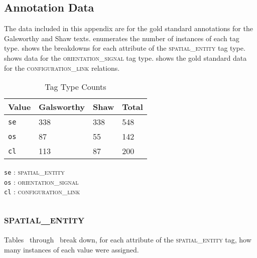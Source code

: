 \documentclass[11pt]{article}
\newcommand{\crefrangeconjunction}{~through~}
\begin{document}
\begin{appendix}
    \newpage
    \appendixpage
    \section{Annotation Data} %
    \label{sec:annotation_data}
    
    The data included in this appendix are for the gold standard annotations for the Galsworthy and Shaw texts.  enumerates the number of instances of each tag type.  shows the breakdowns for each attribute of the \textsc{spatial\_entity} tag type.  shows data for the \textsc{orientation\_signal} tag type.  shows the gold standard data for the \textsc{configuration\_link} relations.
    
    \begin{table}[here]
    \begin{center}
    \begin{tabular}
        {|l|l|l|l|}
        \hline  \textbf{Value} & \textbf{Galsworthy} & \textbf{Shaw} & \textbf{Total} \\
        \hline  \texttt{se}     & 338 & 338 & 548 \\
        \hline  \texttt{os} & 87  & 55 & 142 \\
        \hline  \texttt{cl} & 113 & 87 & 200 \\
        \hline
    \end{tabular}
    \caption{Tag Type Counts}
    \texttt{se} : \textsc{spatial\_entity}\\
    \texttt{os} : \textsc{orientation\_signal}\\
    \texttt{cl} : \textsc{configuration\_link}
    \label{tab:tag-type-counts}
    \end{center}
    \end{table} 
    
    \subsection{\textsc{spatial\_entity}} %
    \label{sub:spatial_entity-counts}
    
    Tables \crefrangeconjunction{} break down, for each attribute of the \textsc{spatial\_entity} tag, how many instances of each value were assigned.
    

\end{appendix}
\end{document}
